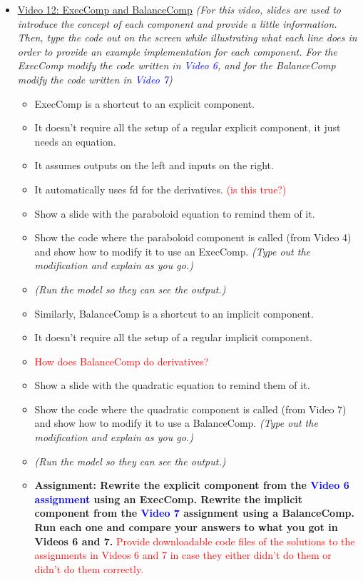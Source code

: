 \documentclass[12pt, letterpaper]{article}
\begin{document}
\begin{itemize}
	\item \underline{Video 12: ExecComp and BalanceComp} \textit{(For this video, slides are used to introduce the concept of each component and provide a little information. Then, type the code out on the screen while illustrating what each line does in order to provide an example implementation for each component. For the ExecComp modify the code written in \textcolor{blue}{Video 6}, and for the BalanceComp modify the code written in \textcolor{blue}{Video 7})} 
		\begin{itemize}
			\item ExecComp is a shortcut to an explicit component. 
			\item It doesn’t require all the setup of a regular explicit component, it just needs an equation.
			\item It assumes outputs on the left and inputs on the right. 
			\item It automatically uses fd for the derivatives. \textcolor{red}{(is this true?)}
			\item Show a slide with the paraboloid equation to remind them of it.
			\item Show the code where the paraboloid component is called (from Video 4) and show how to modify it to use an ExecComp. \textit{(Type out the modification and explain as you go.)}
			\item \textit{(Run the model so they can see the output.)}
			\item Similarly, BalanceComp is a shortcut to an implicit component.
			\item It doesn’t require all the setup of a regular implicit component.
			\item \textcolor{red}{How does BalanceComp do derivatives?}
			\item Show a slide with the quadratic equation to remind them of it.
			\item Show the code where the quadratic component is called (from Video 7) and show how to modify it to use a BalanceComp. \textit{(Type out the modification and explain as you go.)}
			\item \textit{(Run the model so they can see the output.)}
			\item \textbf{Assignment: Rewrite the explicit component from the \textcolor{blue}{Video 6 assignment} using an ExecComp. Rewrite the implicit component from the \textcolor{blue}{Video 7} assignment using a BalanceComp. Run each one and compare your answers to what you got in Videos 6 and 7.} \textcolor{red}{Provide downloadable code files of the solutions to the assignments in Videos 6 and 7 in case they either didn't do them or didn't do them correctly.}
		\end{itemize}


\end{itemize}
\end{document}
